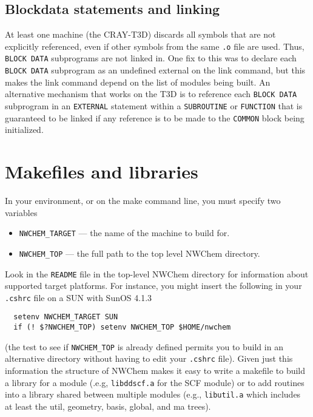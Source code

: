 \subsection{Blockdata statements and linking}

At least one machine (the CRAY-T3D) discards all symbols that are not
explicitly referenced, even if other symbols from the same \verb+.o+
file are used.  Thus, \verb+BLOCK DATA+ subprograms are not linked in.
One fix to this was to declare each \verb+BLOCK DATA+ subprogram as an
undefined external on the link command, but this makes the link
command depend on the list of modules being built.  An alternative
mechanism that works on the T3D is to reference each \verb+BLOCK DATA+
subprogram in an \verb+EXTERNAL+ statement within a \verb+SUBROUTINE+ or
\verb+FUNCTION+ that is guaranteed to be linked if any reference is to
be made to the \verb+COMMON+ block being initialized.


\section{Makefiles and libraries}

In your environment, or on the make command line, you must specify two
variables
\begin{itemize}
\item {\tt NWCHEM\_TARGET} --- the name of the machine to build for.
\item {\tt NWCHEM\_TOP} --- the full path to the top level NWChem
  directory.
\end{itemize}
Look in the {\tt README} file in the top-level NWChem directory for
information about supported target platforms.  For instance, you might
insert the following in your \verb+.cshrc+ file on a SUN with SunOS
4.1.3 
\begin{verbatim}
  setenv NWCHEM_TARGET SUN
  if (! $?NWCHEM_TOP) setenv NWCHEM_TOP $HOME/nwchem
\end{verbatim}
(the test to see if \verb+NWCHEM_TOP+ is already defined permits you
to build in an alternative directory without having to edit your
\verb+.cshrc+ file).  Given just this information the structure of
NWChem makes it easy to write a makefile to build a library for a
module (.e.g, {\tt libddscf.a} for the SCF module) or to add routines
into a library shared between multiple modules (e.g., {\tt libutil.a}
which includes at least the util, geometry, basis, global, and ma
trees).

